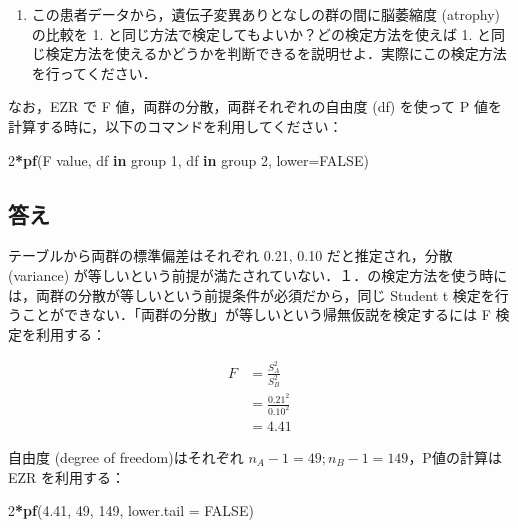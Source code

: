 \documentclass[11pt,]{problemset}
\newenvironment{Shaded}{\begin{snugshade}}{\end{snugshade}}
\newcommand{\ControlFlowTok}[1]{\textcolor[rgb]{0.13,0.29,0.53}{\textbf{#1}}}
\newcommand{\DataTypeTok}[1]{\textcolor[rgb]{0.13,0.29,0.53}{#1}}
\newcommand{\DecValTok}[1]{\textcolor[rgb]{0.00,0.00,0.81}{#1}}
\newcommand{\FloatTok}[1]{\textcolor[rgb]{0.00,0.00,0.81}{#1}}
\newcommand{\KeywordTok}[1]{\textcolor[rgb]{0.13,0.29,0.53}{\textbf{#1}}}
\newcommand{\NormalTok}[1]{#1}
\newcommand{\OperatorTok}[1]{\textcolor[rgb]{0.81,0.36,0.00}{\textbf{#1}}}
\newcommand{\OtherTok}[1]{\textcolor[rgb]{0.56,0.35,0.01}{#1}}
\providecommand{\tightlist}{%
  \setlength{\itemsep}{0pt}\setlength{\parskip}{0pt}}
\begin{document}
\begin{enumerate}
\def\labelenumi{\arabic{enumi}.}
\setcounter{enumi}{1}
\tightlist
\item
  この患者データから，遺伝子変異ありとなしの群の間に脳萎縮度 (atrophy)
  の比較を 1. と同じ方法で検定してもよいか？どの検定方法を使えば 1.
  と同じ検定方法を使えるかどうかを判断できるを説明せよ．実際にこの検定方法を行ってください．
\end{enumerate}

なお，EZR で F 値，両群の分散，両群それぞれの自由度 (df) を使って P
値を計算する時に，以下のコマンドを利用してください：

\begin{Shaded}
\begin{Highlighting}[]
\DecValTok{2}\OperatorTok{*}\KeywordTok{pf}\NormalTok{(F value, df }\ControlFlowTok{in}\NormalTok{ group }\DecValTok{1}\NormalTok{, df }\ControlFlowTok{in}\NormalTok{ group }\DecValTok{2}\NormalTok{, }\DataTypeTok{lower=}\OtherTok{FALSE}\NormalTok{)}
\end{Highlighting}
\end{Shaded}

\hypertarget{-1}{%
\subsection{答え}\label{-1}}

テーブルから両群の標準偏差はそれぞれ 0.21, 0.10 だと推定され，分散
(variance)
が等しいという前提が満たされていない．１．の検定方法を使う時には，両群の分散が等しいという前提条件が必須だから，同じ
Student t
検定を行うことができない．「両群の分散」が等しいという帰無仮説を検定するには
F 検定を利用する：

\[
\begin{aligned}
F & = \frac{S^2_A}{S^2_B} \\
  & = \frac{0.21^2}{0.10^2} \\
  & = 4.41
\end{aligned}
\]

自由度 (degree of freedom)はそれぞれ
\(n_A - 1 = 49; n_B -1 = 149\)，P値の計算は EZR を利用する：

\begin{Shaded}
\begin{Highlighting}[]
\DecValTok{2}\OperatorTok{*}\KeywordTok{pf}\NormalTok{(}\FloatTok{4.41}\NormalTok{, }\DecValTok{49}\NormalTok{, }\DecValTok{149}\NormalTok{, }\DataTypeTok{lower.tail =} \OtherTok{FALSE}\NormalTok{)}
\end{Highlighting}
\end{Shaded}
\end{document}
